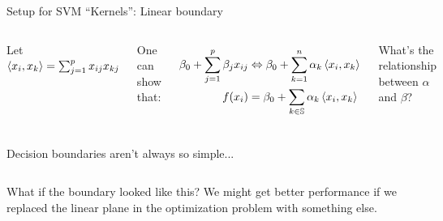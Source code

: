 \documentclass[mathserif, aspectratio=169]{beamer}
\begin{document}
\begin{frame}{Setup for SVM ``Kernels'': Linear boundary}

	\begin{columns}
		\vspace{10mm}

		Let $\braket{x_i,x_k} = \sum_{j=1}^px_{ij}x_{kj}$

		\vspace{5mm}

		One can show that:

		\begin{align*}
			\beta_0 + \sum_{j=1}^p \beta_j x_{ij} & \Leftrightarrow \beta_0 + \sum_{k=1}^n \alpha_k \braket{x_i,x_k} \\
			f(x_i)                                & = \beta_0 + \sum_{k\in \mathbb{S}} \alpha_k \braket{x_i,x_k}     \\
		\end{align*}

		What's the relationship between $\alpha$ and $\beta$?
		\vspace{50mm}
	\end{columns}
\end{frame}


\begin{frame}{Decision boundaries aren't always so simple...}

	\begin{columns}
		\column{0.5\textwidth}
		What if the boundary looked like this?
		\vspace{40mm}
		\column{0.5\textwidth}
		We might get better performance if we replaced the linear plane in the optimization problem with something else.

	\end{columns}
\end{frame}
\end{document}
